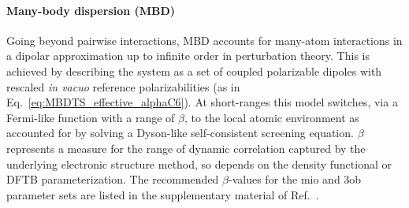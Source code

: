 \documentclass[reprint,onecolumn,superscriptaddress]{revtex4-1}
\begin{document}
\paragraph{Many-body dispersion (MBD)}
Going beyond pairwise interactions, MBD\cite{Tkatchenko2012,Ambrosetti2014}
accounts for many-atom interactions in a dipolar approximation up to infinite
order in perturbation theory. This is achieved by describing the system as a set
of coupled polarizable dipoles\cite{Tkatchenko2012} with rescaled \textit{in
  vacuo} reference polarizabilities (as in
Eq.~\eqref{eq:MBDTS_effective_alphaC6}). At short-ranges this model switches,
via a Fermi-like function with a range of $\beta$, to the local atomic
environment as accounted for by solving a Dyson-like self-consistent screening
equation.\cite{Ambrosetti2014} $\beta$ represents a measure for the range of
dynamic correlation captured by the underlying electronic structure method, so
depends on the density functional or DFTB parameterization. The recommended
$\beta$-values for the mio and 3ob parameter sets are listed in the
supplementary material of Ref.~\cite{hourahine-JCP-152-124101}.
\end{document}
